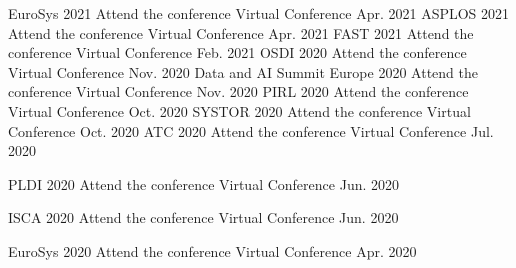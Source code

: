 
\begin{cvhonors}
  \cvhonor
    {EuroSys 2021} %
    {Attend the conference} %
    {Virtual Conference} %
    {Apr. 2021} %
  \cvhonor
    {ASPLOS 2021} %
    {Attend the conference} %
    {Virtual Conference} %
    {Apr. 2021} %
  \cvhonor
    {FAST 2021} %
    {Attend the conference} %
    {Virtual Conference} %
    {Feb. 2021} %
  \cvhonor
    {OSDI 2020} %
    {Attend the conference} %
    {Virtual Conference} %
    {Nov. 2020} %
  \cvhonor
    {Data and AI Summit Europe 2020} %
    {Attend the conference} %
    {Virtual Conference} %
    {Nov. 2020} %
  \cvhonor
    {PIRL 2020} %
    {Attend the conference} %
    {Virtual Conference} %
    {Oct. 2020} %
  \cvhonor
    {SYSTOR 2020} %
    {Attend the conference} %
    {Virtual Conference} %
    {Oct. 2020} %
  \cvhonor
    {ATC 2020} %
    {Attend the conference} %
    {Virtual Conference} %
    {Jul. 2020} %

  \cvhonor
    {PLDI 2020} %
    {Attend the conference} %
    {Virtual Conference} %
    {Jun. 2020} %

  \cvhonor
    {ISCA 2020} %
    {Attend the conference} %
    {Virtual Conference} %
    {Jun. 2020} %

  \cvhonor
    {EuroSys 2020} %
    {Attend the conference} %
    {Virtual Conference} %
    {Apr. 2020} %


\end{cvhonors}
